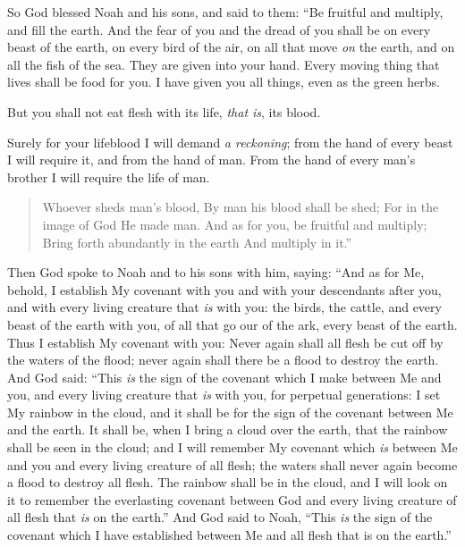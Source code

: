 
\bverse So God blessed Noah and his sons, and said to them: ``Be fruitful and multiply, and fill the earth.
\bverse And the fear of you and the dread of you shall be on every beast of the earth, on every bird of the air, on all that move \textit{on} the earth, and on all the fish of the sea. They are given into your hand.
\bverse Every moving thing that lives shall be food for you. I have given you all things, even as the green herbs.

\bverse But you shall not eat flesh with its life, \textit{that is}, its blood.

\bverse Surely for your lifeblood I will demand \textit{a reckoning}; from the hand of every beast I will require it, and from the hand of man. From the hand of every man's brother I will require the life of man.
\begin{quotation}
\bverse Whoever sheds man's blood, By man his blood shall be shed; For in the image of God He made man. 
\bverse And as for you, be fruitful and multiply; Bring forth abundantly in the earth And multiply in it.''
\end{quotation}
\bverse Then God spoke to Noah and to his sons with him, saying:
\bverse ``And as for Me, behold, I establish My covenant with you and with your descendants after you,
\bverse and with every living creature that \textit{is} with you: the birds, the cattle, and every beast of the earth with you, of all that go our of the ark, every beast of the earth.
\bverse Thus I establish My covenant with you: Never again shall all flesh be cut off by the waters of the flood; never again shall there be a flood to destroy the earth.
\bverse And God said: ``This \textit{is} the sign of the covenant which I make between Me and you, and every living creature that \textit{is} with you, for perpetual generations:
\bverse I set My rainbow in the cloud, and it shall be for the sign of the covenant between Me and the earth.
\bverse It shall be, when I bring a cloud over the earth, that the rainbow shall be seen in the cloud;
\bverse and I will remember My covenant which \textit{is} between Me and you and every living creature of all flesh; the waters shall never again become a flood to destroy all flesh.
\bverse The rainbow shall be in the cloud, and I will look on it to remember the everlasting covenant between God and every living creature of all flesh that \textit{is} on the earth.''
\bverse And God said to Noah, ``This \textit{is} the sign of the covenant which I have established between Me and all flesh that is on the earth.''

